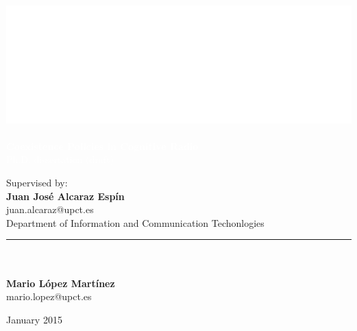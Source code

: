 \graphicspath{ {img/} }

\makeatletter                   
\def\printauthor{%
    {\large \@author}}          
\makeatother

\author{%

    }
\begin{titlingpage}
\BgThispage
{}
\vspace*{0.25\textheight}
\noindent
\includegraphics{logo.eps}\\\\ 
\textcolor{white}{\Huge\textbf{{Coexistence Policies in Cognitive Radio}}}\vspace*{0.25cm}\\
\noindent
\hspace*{1cm}\textcolor{white}{\normalsize{Ph.D. dissertation (draft)}}
\vspace*{3cm}\par
\noindent
\hspace*{3.5cm}
\begin{minipage}{0.35\linewidth}
    \begin{flushright}
    Supervised by:\\
    \textbf{Juan Jos\'e Alcaraz Esp\'in}\\
    juan.alcaraz@upct.es\vspace*{1cm}\\
    Department of Information and Communication Techonlogies\\
    \end{flushright}
\end{minipage} \hspace{15pt}
%
\begin{minipage}{0.02\linewidth}
    \rule{1pt}{175pt}
\end{minipage} \hspace{0pt}
%
\begin{minipage}{0.63\linewidth}
\vspace{9pt}
    ~\\
    ~\\
    \normalsize\textbf{Mario L\'{o}pez Mart\'{i}nez} \\
    \normalsize{mario.lopez@upct.es}\\
\end{minipage}
\vfill
\hspace{0.5\linewidth}January 2015
\end{titlingpage}
\restoregeometry